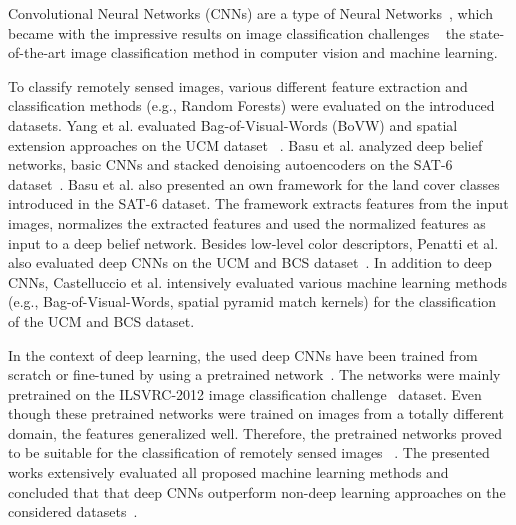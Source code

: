 \documentclass[journal]{IEEEtran}
\begin{document}
Convolutional Neural Networks (CNNs) are a type of Neural Networks~\cite{lecun1989backpropagation}, which became with the impressive results on image classification challenges ~\cite{krizhevsky2012imagenet, ILSVRC15, simonyan2014very} the state-of-the-art image classification method in computer vision and machine learning.

To classify remotely sensed images, various different feature extraction and classification methods (e.g., Random Forests) were evaluated on the introduced datasets. Yang et al. evaluated Bag-of-Visual-Words (BoVW) and spatial extension approaches on the UCM dataset ~\cite{yang2010bag}. Basu et al. analyzed deep belief networks, basic CNNs and stacked denoising autoencoders on the SAT-6 dataset~\cite{basu2015deepsat}. Basu et al. also presented an own framework for the land cover classes introduced in the SAT-6 dataset. The framework extracts features from the input images, normalizes the extracted features and used the normalized features as input to a deep belief network. Besides low-level color descriptors, Penatti et al. also evaluated deep CNNs on the UCM and BCS dataset~\cite{penatti2015deep}. In addition to deep CNNs, Castelluccio et al. intensively evaluated various machine learning methods (e.g., Bag-of-Visual-Words, spatial pyramid match kernels) for the classification of the UCM and BCS dataset. 

In the context of deep learning, the used deep CNNs have been trained from scratch or fine-tuned by using a pretrained network~\cite{castelluccio2015land, nogueira2017towards, ahmad2017cnn, cheng2017remote, ma2016satellite}. The networks were mainly pretrained on the ILSVRC-2012 image classification challenge~\cite{ILSVRC15} dataset. Even though these pretrained networks were trained on images from a totally different domain, the features generalized well. Therefore, the pretrained networks proved to be suitable for the classification of remotely sensed images ~\cite{marmanis2016deep}. The presented works extensively evaluated all proposed machine learning methods and concluded that that deep CNNs outperform non-deep learning approaches on the considered datasets~\cite{castelluccio2015land, marmanis2016deep, luus2015multiview, xia2016aid}. 


\end{document}
